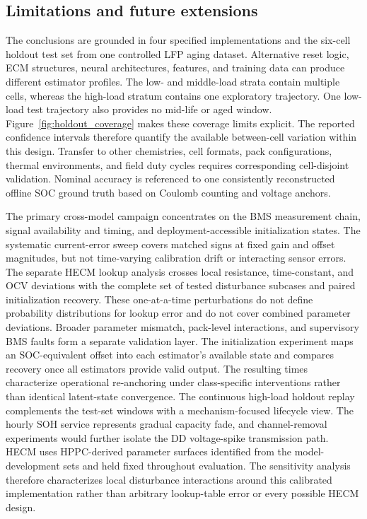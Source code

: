 \documentclass[review,nopreprintline]{elsarticle}
\begin{document}
\subsection{Limitations and future extensions}
The conclusions are grounded in four specified implementations and the six-cell holdout test set from one controlled LFP aging dataset. Alternative reset logic, ECM structures, neural architectures, features, and training data can produce different estimator profiles. The low- and middle-load strata contain multiple cells, whereas the high-load stratum contains one exploratory trajectory. One low-load test trajectory also provides no mid-life or aged window. Figure~\ref{fig:holdout_coverage} makes these coverage limits explicit. The reported confidence intervals therefore quantify the available between-cell variation within this design. Transfer to other chemistries, cell formats, pack configurations, thermal environments, and field duty cycles requires corresponding cell-disjoint validation. Nominal accuracy is referenced to one consistently reconstructed offline SOC ground truth based on Coulomb counting and voltage anchors.

The primary cross-model campaign concentrates on the BMS measurement chain, signal availability and timing, and deployment-accessible initialization states. The systematic current-error sweep covers matched signs at fixed gain and offset magnitudes, but not time-varying calibration drift or interacting sensor errors. The separate HECM lookup analysis crosses local resistance, time-constant, and OCV deviations with the complete set of tested disturbance subcases and paired initialization recovery. These one-at-a-time perturbations do not define probability distributions for lookup error and do not cover combined parameter deviations. Broader parameter mismatch, pack-level interactions, and supervisory BMS faults form a separate validation layer. The initialization experiment maps an SOC-equivalent offset into each estimator's available state and compares recovery once all estimators provide valid output. The resulting times characterize operational re-anchoring under class-specific interventions rather than identical latent-state convergence. The continuous high-load holdout replay complements the test-set windows with a mechanism-focused lifecycle view. The hourly SOH service represents gradual capacity fade, and channel-removal experiments would further isolate the DD voltage-spike transmission path. HECM uses HPPC-derived parameter surfaces identified from the model-development sets and held fixed throughout evaluation. The sensitivity analysis therefore characterizes local disturbance interactions around this calibrated implementation rather than arbitrary lookup-table error or every possible HECM design.
\end{document}
